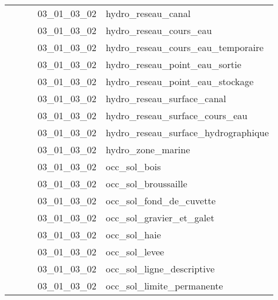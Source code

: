 \documentclass[12pt,titlepage]{book}
\begin{document}
\begin{supertabular}{|p{7.5cm}|p{7.5cm}|p{7.5cm}|c|p{10cm}|}
                   &                    &                    & 03\_01\_03\_02 & hydro\_reseau\_canal\\
                   &                    &                    & 03\_01\_03\_02 & hydro\_reseau\_cours\_eau\\
                   &                    &                    & 03\_01\_03\_02 & hydro\_reseau\_cours\_eau\_temporaire\\
                   &                    &                    & 03\_01\_03\_02 & hydro\_reseau\_point\_eau\_sortie\\
                   &                    &                    & 03\_01\_03\_02 & hydro\_reseau\_point\_eau\_stockage\\
                   &                    &                    & 03\_01\_03\_02 & hydro\_reseau\_surface\_canal\\
                   &                    &                    & 03\_01\_03\_02 & hydro\_reseau\_surface\_cours\_eau\\
                   &                    &                    & 03\_01\_03\_02 & hydro\_reseau\_surface\_hydrographique\\
                   &                    &                    & 03\_01\_03\_02 & hydro\_zone\_marine\\
                   &                    &                    & 03\_01\_03\_02 & occ\_sol\_bois\\
                   &                    &                    & 03\_01\_03\_02 & occ\_sol\_broussaille\\
                   &                    &                    & 03\_01\_03\_02 & occ\_sol\_fond\_de\_cuvette\\
                   &                    &                    & 03\_01\_03\_02 & occ\_sol\_gravier\_et\_galet\\
                   &                    &                    & 03\_01\_03\_02 & occ\_sol\_haie\\
                   &                    &                    & 03\_01\_03\_02 & occ\_sol\_levee\\
                   &                    &                    & 03\_01\_03\_02 & occ\_sol\_ligne\_descriptive\\
                   &                    &                    & 03\_01\_03\_02 & occ\_sol\_limite\_permanente\\

\end{supertabular}
\end{document}
